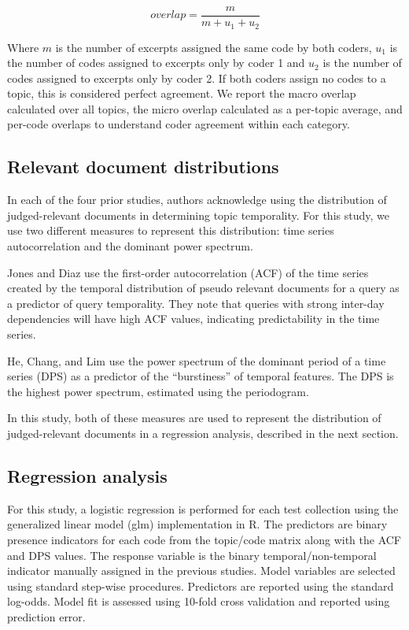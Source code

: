 \documentclass{sig-alternate}
\begin{document}
\[
overlap = \frac{m}{m + u_1 + u_2} 
\]

Where $m$ is the number of excerpts assigned the same code by both coders, $u_1$ is the number of codes assigned to excerpts only by coder 1 and $u_2$ is the number of codes assigned to excerpts only by coder 2. If both coders assign no codes to a topic, this is considered perfect agreement. We report the macro overlap calculated over all topics, the micro overlap calculated as a per-topic average, and per-code overlaps to understand coder agreement within each category.

\subsection{Relevant document distributions}

In each of the four prior studies, authors acknowledge using the distribution of judged-relevant documents in determining topic temporality. For this study, we use two different measures to represent this distribution: time series autocorrelation and the dominant power spectrum.

Jones and Diaz \cite{Jones2007} use the first-order autocorrelation (ACF) of the time series created by the temporal distribution of pseudo relevant documents for a query as a predictor of query temporality. They note that queries with strong inter-day dependencies will have high ACF values, indicating predictability in the time series.

He, Chang, and Lim \cite{He2007} use the power spectrum of the dominant period of a time series (DPS) as a predictor of the ``burstiness'' of temporal features. The DPS is the highest power spectrum, estimated using the periodogram. 

In this study, both of these measures are used to represent the distribution of judged-relevant documents in a regression analysis, described in the next section.

\subsection{Regression analysis}

For this study, a logistic regression is performed for each test collection using the generalized linear model (glm) implementation in R. The predictors are binary presence indicators for each code from the topic/code matrix along with the ACF and DPS values. The response variable is the binary temporal/non-temporal indicator manually assigned in the previous studies. Model variables are selected using standard step-wise procedures. Predictors are reported using the standard log-odds. Model fit is assessed using 10-fold cross validation and reported using prediction error.
\end{document}

